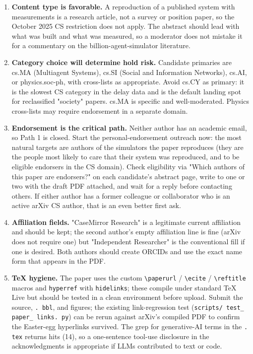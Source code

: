 \documentclass[twocolumn,10pt,letterpaper]{article}
\begin{document}
\begin{enumerate}
\setlength{\itemsep}{0pt}
\setlength{\parskip}{0pt}
  \item \textbf{Content type is favorable.} A reproduction of a published system with measurements is a research article, not a survey or position paper, so the October 2025 CS restriction does not apply. The abstract should lead with what was built and what was measured, so a moderator does not mistake it for a commentary on the billion-agent-simulator literature.
  \item \textbf{Category choice will determine hold risk.} Candidate primaries are cs.MA (Multiagent Systems), cs.SI (Social and Information Networks), cs.AI, or physics.soc-ph, with cross-lists as appropriate. Avoid cs.CY as primary: it is the slowest CS category in the delay data and is the default landing spot for reclassified "society" papers. cs.MA is specific and well-moderated. Physics cross-lists may require endorsement in a separate domain.
  \item \textbf{Endorsement is the critical path.} Neither author has an academic email, so Path 1 is closed. Start the personal-endorsement outreach now: the most natural targets are authors of the simulators the paper reproduces (they are the people most likely to care that their system was reproduced, and to be eligible endorsers in the CS domain). Check eligibility via "Which authors of this paper are endorsers?" on each candidate's abstract page, write to one or two with the draft PDF attached, and wait for a reply before contacting others. If either author has a former colleague or collaborator who is an active arXiv CS author, that is an even better first ask.
  \item \textbf{Affiliation fields.} "CaseMirror Research" is a legitimate current affiliation and should be kept; the second author's empty affiliation line is fine (arXiv does not require one) but "Independent Researcher" is the conventional fill if one is desired. Both authors should create ORCIDs and use the exact name form that appears in the PDF.
  \item \textbf{TeX hygiene.} The paper uses the custom \texttt{\textbackslash{}paperurl} / \texttt{\textbackslash{}ecite} / \texttt{\textbackslash{}reftitle} macros and \texttt{hyperref} with \texttt{hidelinks}; these compile under standard TeX Live but should be tested in a clean environment before upload. Submit the source, \texttt{. bbl}, and figures; the existing link-regression test (\texttt{scripts/ test\_ paper\_ links. py}) can be rerun against arXiv's compiled PDF to confirm the Easter-egg hyperlinks survived. The grep for generative-AI terms in the \texttt{. tex} returns hits (14), so a one-sentence tool-use disclosure in the acknowledgments is appropriate if LLMs contributed to text or code.

\end{enumerate}
\end{document}
